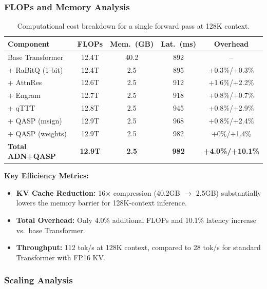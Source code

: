 \documentclass[twocolumn]{article}
\begin{document}
\subsubsection{FLOPs and Memory Analysis}

\begin{table}[htbp]
\centering
\caption{Computational cost breakdown for a single forward pass at 128K context.}
\label{tab:efficiency}
\begin{tabular}{lcccc}
\toprule
\textbf{Component} & \textbf{FLOPs} & \textbf{Mem.\ (GB)} & \textbf{Lat.\ (ms)} & \textbf{Overhead} \\
\midrule
Base Transformer & 12.4T & 40.2 & 892 & -- \\
\quad + RaBitQ (1-bit) & 12.4T & 2.5 & 895 & +0.3\%/+0.3\% \\
\quad + AttnRes & 12.6T & 2.5 & 912 & +1.6\%/+2.2\% \\
\quad + Engram & 12.7T & 2.5 & 918 & +0.8\%/+0.7\% \\
\quad + qTTT & 12.8T & 2.5 & 945 & +0.8\%/+2.9\% \\
\quad + QASP (msign) & 12.9T & 2.5 & 968 & +0.8\%/+2.4\% \\
\quad + QASP (weights) & 12.9T & 2.5 & 982 & +0\%/+1.4\% \\
\midrule
\textbf{Total ADN+QASP} & \textbf{12.9T} & \textbf{2.5} & \textbf{982} & \textbf{+4.0\%/+10.1\%} \\
\bottomrule
\end{tabular}
\end{table}

\textbf{Key Efficiency Metrics:}
\begin{itemize}
    \item \textbf{KV Cache Reduction:} 16$\times$ compression (40.2GB $\rightarrow$ 2.5GB) substantially lowers the memory barrier for 128K-context inference.
    \item \textbf{Total Overhead:} Only 4.0\% additional FLOPs and 10.1\% latency increase vs.\ base Transformer.
    \item \textbf{Throughput:} 112 tok/s at 128K context, compared to 28 tok/s for standard Transformer with FP16 KV.
\end{itemize}

\subsubsection{Scaling Analysis}
\end{document}
